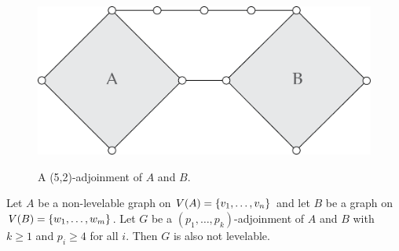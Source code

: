 \begin{figure}[!h]
    \myfloatalign
    {\includegraphics[width=.65\linewidth]{figures/adjoinment.png}} 
    \caption{A (5,2)-adjoinment of $A$ and $B$.}
\end{figure}

\begin{theorem} \label{thm:adjoinment}
Let $A$ be a non-levelable graph on $V(A) = \{ v_1, \dots, v_n \}$ and let $B$ be a graph on $V(B) = \{ w_1, \dots, w_m \}$. Let $G$ be a $(p_1, \dots, p_k)$-adjoinment of $A$ and $B$ with $k \geq 1$ and $p_i \geq 4$ for all $i$. Then $G$ is also not levelable.
\end{theorem}

